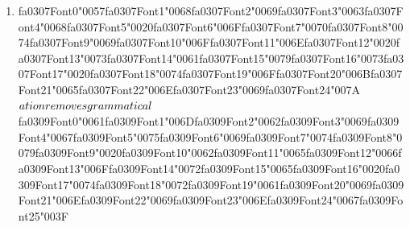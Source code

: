 \documentclass[12pt]{article}
\begin{document}
\begin{enumerate}[label=Q\arabic*.]
 \item {\csname fa0307Font0\endcsname\char"0057}{\csname fa0307Font1\endcsname\char"0068}{\csname fa0307Font2\endcsname\char"0069}{\csname fa0307Font3\endcsname\char"0063}{\csname fa0307Font4\endcsname\char"0068}{\csname fa0307Font5\endcsname\char"0020}{\csname fa0307Font6\endcsname\char"006F}{\csname fa0307Font7\endcsname\char"0070}{\csname fa0307Font8\endcsname\char"0074}{\csname fa0307Font9\endcsname\char"0069}{\csname fa0307Font10\endcsname\char"006F}{\csname fa0307Font11\endcsname\char"006E}{\csname fa0307Font12\endcsname\char"0020}{\csname fa0307Font13\endcsname\char"0073}{\csname fa0307Font14\endcsname\char"0061}{\csname fa0307Font15\endcsname\char"0079}{\csname fa0307Font16\endcsname\char"0073}{\csname fa0307Font17\endcsname\char"0020}{\csname fa0307Font18\endcsname\char"0074}{\csname fa0307Font19\endcsname\char"006F}{\csname fa0307Font20\endcsname\char"006B}{\csname fa0307Font21\endcsname\char"0065}{\csname fa0307Font22\endcsname\char"006E}{\csname fa0307Font23\endcsname\char"0069}{\csname fa0307Font24\endcsname\char"007A}\({\csname fa0308Font0\endcsname\char"0061}{\csname fa0308Font1\endcsname\char"0074}{\csname fa0308Font2\endcsname\char"0069}{\csname fa0308Font3\endcsname\char"006F}{\csname fa0308Font4\endcsname\char"006E}{\csname fa0308Font5\endcsname\char"0020}{\csname fa0308Font6\endcsname\char"0072}{\csname fa0308Font7\endcsname\char"0065}{\csname fa0308Font8\endcsname\char"006D}{\csname fa0308Font9\endcsname\char"006F}{\csname fa0308Font10\endcsname\char"0076}{\csname fa0308Font11\endcsname\char"0065}{\csname fa0308Font12\endcsname\char"0073}{\csname fa0308Font13\endcsname\char"0020}{\csname fa0308Font14\endcsname\char"0067}{\csname fa0308Font15\endcsname\char"0072}{\csname fa0308Font16\endcsname\char"0061}{\csname fa0308Font17\endcsname\char"006D}{\csname fa0308Font18\endcsname\char"006D}{\csname fa0308Font19\endcsname\char"0061}{\csname fa0308Font20\endcsname\char"0074}{\csname fa0308Font21\endcsname\char"0069}{\csname fa0308Font22\endcsname\char"0063}{\csname fa0308Font23\endcsname\char"0061}{\csname fa0308Font24\endcsname\char"006C}{\csname fa0308Font25\endcsname\char"0020}\){\csname fa0309Font0\endcsname\char"0061}{\csname fa0309Font1\endcsname\char"006D}{\csname fa0309Font2\endcsname\char"0062}{\csname fa0309Font3\endcsname\char"0069}{\csname fa0309Font4\endcsname\char"0067}{\csname fa0309Font5\endcsname\char"0075}{\csname fa0309Font6\endcsname\char"0069}{\csname fa0309Font7\endcsname\char"0074}{\csname fa0309Font8\endcsname\char"0079}{\csname fa0309Font9\endcsname\char"0020}{\csname fa0309Font10\endcsname\char"0062}{\csname fa0309Font11\endcsname\char"0065}{\csname fa0309Font12\endcsname\char"0066}{\csname fa0309Font13\endcsname\char"006F}{\csname fa0309Font14\endcsname\char"0072}{\csname fa0309Font15\endcsname\char"0065}{\csname fa0309Font16\endcsname\char"0020}{\csname fa0309Font17\endcsname\char"0074}{\csname fa0309Font18\endcsname\char"0072}{\csname fa0309Font19\endcsname\char"0061}{\csname fa0309Font20\endcsname\char"0069}{\csname fa0309Font21\endcsname\char"006E}{\csname fa0309Font22\endcsname\char"0069}{\csname fa0309Font23\endcsname\char"006E}{\csname fa0309Font24\endcsname\char"0067}{\csname fa0309Font25\endcsname\char"003F}

\end{enumerate}
\end{document}
